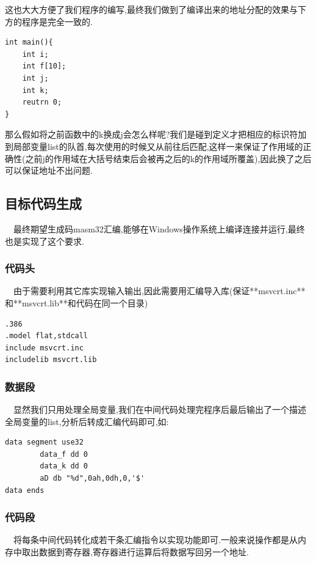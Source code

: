 \documentclass{article}
\begin{document}
这也大大方便了我们程序的编写,最终我们做到了编译出来的地址分配的效果与下方的程序是完全一致的.

\begin{verbatim}
int main(){
    int i;
    int f[10];
    int j;
    int k;
    reutrn 0;
}
\end{verbatim}

那么假如将之前函数中的k换成j会怎么样呢?我们是碰到定义才把相应的标识符加到局部变量list的队首,每次使用的时候又从前往后匹配,这样一来保证了作用域的正确性(之前j的作用域在大括号结束后会被再之后的k的作用域所覆盖),因此换了之后可以保证地址不出问题.

\subsection{目标代码生成}

\quad\ \ 最终期望生成码masm32汇编,能够在Windows操作系统上编译连接并运行,最终也是实现了这个要求.

\subsubsection{代码头}

\quad\ \ 由于需要利用其它库实现输入输出,因此需要用汇编导入库(保证**msvcrt.inc**和**msvcrt.lib**和代码在同一个目录)

\begin{verbatim}
.386
.model flat,stdcall
include msvcrt.inc
includelib msvcrt.lib
\end{verbatim}

\subsubsection{数据段}

\quad\ \ 显然我们只用处理全局变量,我们在中间代码处理完程序后最后输出了一个描述全局变量的list,分析后转成汇编代码即可,如:

\begin{verbatim}
data segment use32
        data_f dd 0
        data_k dd 0
        aD db "%d",0ah,0dh,0,'$'
data ends        
\end{verbatim}

\subsubsection{代码段}

\quad\ \ 将每条中间代码转化成若干条汇编指令以实现功能即可.一般来说操作都是从内存中取出数据到寄存器,寄存器进行运算后将数据写回另一个地址.
\end{document}

